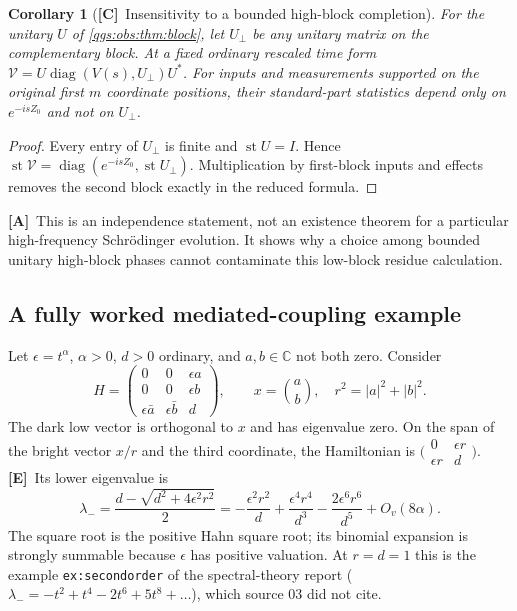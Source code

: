 \documentclass[11pt,oneside]{article}
\numberwithin{equation}{section}
\theoremstyle{plain}
\newtheorem{corollary}[corollary]{Corollary}
\theoremstyle{definition}
\theoremstyle{remark}
\newcommand{\C}{\mathbb C}
\newcommand{\Oval}[1]{O_{v}(#1)}
\DeclareMathOperator{\st}{st}
\DeclareMathOperator{\diag}{diag}
\newcommand{\abs}[1]{\left|#1\right|}
\newcommand{\TE}{\textcolor{TierE}{\textsf{\bfseries[E]}}}
\newcommand{\TC}{\textcolor{TierC}{\textsf{\bfseries[C]}}}
\newcommand{\TA}{\textcolor{TierA}{\textsf{\bfseries[A]}}}
\begin{document}
\begin{corollary}[\TC\ Insensitivity to a bounded high-block completion]\label{qgs:obs:cor:insensitive}
For the unitary $U$ of \cref{qgs:obs:thm:block}, let $U_\perp$ be any unitary matrix on the complementary block. At a fixed ordinary rescaled time form $\mathcal V=U\diag(V(s),U_\perp)U^*$. For inputs and measurements supported on the original first $m$ coordinate positions, their standard-part statistics depend only on $e^{-isZ_0}$ and not on $U_\perp$.
\end{corollary}
\begin{proof}
Every entry of $U_\perp$ is finite and $\st U=I$. Hence $\st\mathcal V=\diag(e^{-isZ_0},\st U_\perp)$. Multiplication by first-block inputs and effects removes the second block exactly in the reduced formula.
\end{proof}

\TA\ This is an independence statement, not an existence theorem for a particular high-frequency Schr\"odinger evolution. It shows why a choice among bounded unitary high-block phases cannot contaminate this low-block residue calculation.

\subsection{A fully worked mediated-coupling example}\label{qgs:obs:sec:threelevel}
Let $\epsilon=t^\alpha$, $\alpha>0$, $d>0$ ordinary, and $a,b\in\C$ not both zero. Consider
\begin{equation}\label{qgs:obs:eq:threeH}
 H=\begin{pmatrix}
 0&0&\epsilon a\\
 0&0&\epsilon b\\
 \epsilon\bar a&\epsilon\bar b&d
 \end{pmatrix},\qquad
 x=\binom a b,\quad r^2=\abs a^2+\abs b^2.
\end{equation}
The dark low vector is orthogonal to $x$ and has eigenvalue zero. On the span of the bright vector $x/r$ and the third coordinate, the Hamiltonian is $\bigl(\begin{smallmatrix}0&\epsilon r\\\epsilon r&d\end{smallmatrix}\bigr)$. \TE\ Its lower eigenvalue is
\begin{equation}\label{qgs:obs:eq:lambda}
 \lambda_-=\frac{d-\sqrt{d^2+4\epsilon^2r^2}}2
 =-\frac{\epsilon^2r^2}{d}
  +\frac{\epsilon^4r^4}{d^3}
  -\frac{2\epsilon^6r^6}{d^5}+\Oval{8\alpha}.
\end{equation}
The square root is the positive Hahn square root; its binomial expansion is strongly summable because $\epsilon$ has positive valuation. At $r=d=1$ this is the example \texttt{ex:secondorder} of the spectral-theory report ($\lambda_-=-t^2+t^4-2t^6+5t^8+\dots$), which source 03 did not cite.
\end{document}
